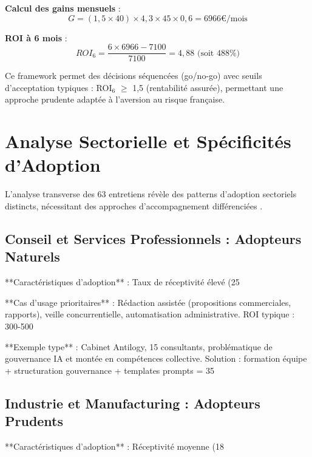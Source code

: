\textbf{Calcul des gains mensuels} :
\[G = (1,5 \times 40) \times 4,3 \times 45 \times 0,6 = 6966\text{€}/\text{mois}\]

\textbf{ROI à 6 mois} :
\[ROI_6 = \frac{6 \times 6966 - 7100}{7100} = 4,88 \text{ (soit 488\%)}\]

Ce framework permet des décisions séquencées (go/no-go) avec seuils d'acceptation typiques : ROI$_6$ $\geq$ 1,5 (rentabilité assurée), permettant une approche prudente adaptée à l'aversion au risque française.

\section{Analyse Sectorielle et Spécificités d'Adoption}

L'analyse transverse des 63 entretiens révèle des patterns d'adoption sectoriels distincts, nécessitant des approches d'accompagnement différenciées \cite{luwai2025meetings}.

\subsection{Conseil et Services Professionnels : Adopteurs Naturels}

**Caractéristiques d'adoption** : Taux de réceptivité élevé (25%

**Cas d'usage prioritaires** : Rédaction assistée (propositions commerciales, rapports), veille concurrentielle, automatisation administrative. ROI typique : 300-500%

**Exemple type** : Cabinet Antilogy, 15 consultants, problématique de gouvernance IA et montée en compétences collective. Solution : formation équipe + structuration gouvernance + templates prompts = 35%

\subsection{Industrie et Manufacturing : Adopteurs Prudents}

**Caractéristiques d'adoption** : Réceptivité moyenne (18%

